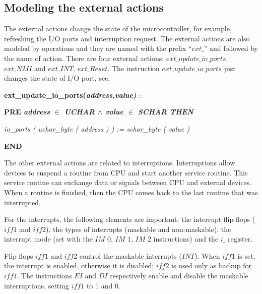 \documentclass[a4paper]{llncs}
\begin{document}
\subsection{Modeling the external actions}
\label{sec:externalactions}

The external actions change the state of the microcontroller, for example,
refreshing the I/O ports and interruption request. The external actions are also
modeled by operations and they are named with the prefix ``$ext\_$'' and
followed by the name of action. There are four external actions:
$ext\_update\_io\_ports$, $ext\_NMI$ and $ext\_INT$, $ext\_Reset$. The
instruction $ext\_update\_io\_ports$ just changes the state of I/O port, see.

\hspace*{0.20in}\bf ext\_update\_io\_ports\rm (\it address\rm ,\it value\rm )\rm =

\hspace*{0.20in}\bf PRE \it address  $\in$  \it UCHAR  $\land$ \hspace*{0.10in}\it value  $\in$  \it SCHAR \bf THEN

\hspace*{0.40in}\it io\_ports \rm ( \it uchar\_byte \rm ( \it address \rm ) \rm ) \rm := \it schar\_byte \rm ( \it
value \rm )

\hspace*{0.20in}\bf END\rm 

The other external actions are related to interruptions. Interruptions allow
devices to suspend a routine from CPU and start another service routine.
This service routine can exchange data or signals between CPU and external
devices. When a routine is finished, then the CPU comes back to the last routine
that was interrupted.

For the interrupts, the following elements are important:  the interrupt flip-flops
($\textit{iff1}$ and $\textit{iff2}$), the types of interrupts (maskable and
non-maskable), the interrupt mode (set with the $\textit{IM 0}$, $\textit{IM 1}$,
$\textit{IM 2}$ instructions) and the $\textit{i\_}$ register.

Flip-flops $\textit{iff1}$ and $\textit{iff2}$ control the maskable interrupts
($\textit{INT}$). When $\textit{iff1}$ is set, the interrupt is enabled,
otherwise it is disabled; $\textit{iff2}$ is used only as backup for $\textit{iff1}$. The
instructions $\textit{EI}$ and $\textit{DI}$ respectively enable and disable the
maskable interruptions, setting  $\textit{iff1}$ to 1 and 0.
\end{document}
